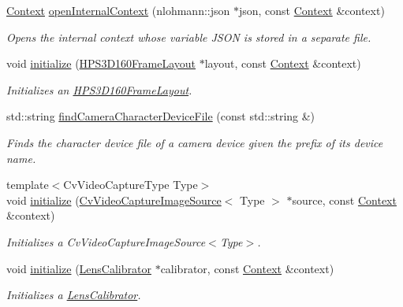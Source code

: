 \begin{DoxyCompactItemize}
\hyperlink{classstereo__ugv_1_1Context}{Context} \hyperlink{namespacestereo__ugv_aef8f9a951e11f9d5d178db99754aac4b}{open\+Internal\+Context} (nlohmann\+::json $\ast$json, const \hyperlink{classstereo__ugv_1_1Context}{Context} \&context)
\begin{DoxyCompactList}\small\item\em Opens the internal context whose variable J\+S\+ON is stored in a separate file. \end{DoxyCompactList}\item 
void \hyperlink{namespacestereo__ugv_ac02cc03581ba53b911a9a7bd87f9a24c}{initialize} (\hyperlink{classstereo__ugv_1_1HPS3D160FrameLayout}{H\+P\+S3\+D160\+Frame\+Layout} $\ast$layout, const \hyperlink{classstereo__ugv_1_1Context}{Context} \&context)
\begin{DoxyCompactList}\small\item\em Initializes an \hyperlink{classstereo__ugv_1_1HPS3D160FrameLayout}{H\+P\+S3\+D160\+Frame\+Layout}. \end{DoxyCompactList}\item 
std\+::string \hyperlink{namespacestereo__ugv_af45c67058883fb26e2c27945af6ab490}{find\+Camera\+Character\+Device\+File} (const std\+::string \&)
\begin{DoxyCompactList}\small\item\em Finds the character device file of a camera device given the prefix of its device name. \end{DoxyCompactList}\item 
{\footnotesize template$<$Cv\+Video\+Capture\+Type Type$>$ }\\void \hyperlink{namespacestereo__ugv_acaec0936792769b5d676773f7d4070cd}{initialize} (\hyperlink{classstereo__ugv_1_1CvVideoCaptureImageSource}{Cv\+Video\+Capture\+Image\+Source}$<$ Type $>$ $\ast$source, const \hyperlink{classstereo__ugv_1_1Context}{Context} \&context)
\begin{DoxyCompactList}\small\item\em Initializes a Cv\+Video\+Capture\+Image\+Source$<$\+Type$>$. \end{DoxyCompactList}\item 
void \hyperlink{namespacestereo__ugv_aab7c44a98ba3f61baec2e4c1c9802bee}{initialize} (\hyperlink{classstereo__ugv_1_1LensCalibrator}{Lens\+Calibrator} $\ast$calibrator, const \hyperlink{classstereo__ugv_1_1Context}{Context} \&context)
\begin{DoxyCompactList}\small\item\em Initializes a \hyperlink{classstereo__ugv_1_1LensCalibrator}{Lens\+Calibrator}. \end{DoxyCompactList}\item 

\end{DoxyCompactItemize}
